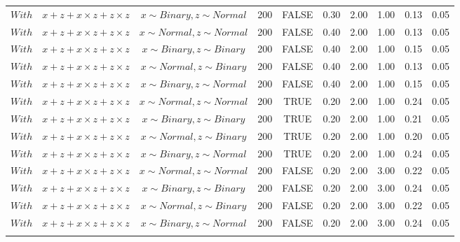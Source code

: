 \begin{longtable}{lccccccccc}
  $With$ & $\textit{x} + \textit{z} + \textit{x} \times \textit{z} + \textit{z} \times \textit{z}$ & $\textit{x} \sim Binary, \textit{z} \sim Normal$ & 200 & FALSE & 0.30 & 2.00 & 1.00 & 0.13 & 0.05 \\ 
  $With$ & $\textit{x} + \textit{z} + \textit{x} \times \textit{z} + \textit{z} \times \textit{z}$ & $\textit{x} \sim Normal , \textit{z} \sim Normal$ & 200 & FALSE & 0.40 & 2.00 & 1.00 & 0.13 & 0.05 \\ 
  $With$ & $\textit{x} + \textit{z} + \textit{x} \times \textit{z} + \textit{z} \times \textit{z}$ & $\textit{x} \sim Binary, \textit{z} \sim Binary$ & 200 & FALSE & 0.40 & 2.00 & 1.00 & 0.15 & 0.05 \\ 
  $With$ & $\textit{x} + \textit{z} + \textit{x} \times \textit{z} + \textit{z} \times \textit{z}$ & $\textit{x} \sim Normal, \textit{z} \sim Binary$ & 200 & FALSE & 0.40 & 2.00 & 1.00 & 0.13 & 0.05 \\ 
  $With$ & $\textit{x} + \textit{z} + \textit{x} \times \textit{z} + \textit{z} \times \textit{z}$ & $\textit{x} \sim Binary, \textit{z} \sim Normal$ & 200 & FALSE & 0.40 & 2.00 & 1.00 & 0.15 & 0.05 \\ 
  $With$ & $\textit{x} + \textit{z} + \textit{x} \times \textit{z} + \textit{z} \times \textit{z}$ & $\textit{x} \sim Normal , \textit{z} \sim Normal$ & 200 & TRUE & 0.20 & 2.00 & 1.00 & 0.24 & 0.05 \\ 
  $With$ & $\textit{x} + \textit{z} + \textit{x} \times \textit{z} + \textit{z} \times \textit{z}$ & $\textit{x} \sim Binary, \textit{z} \sim Binary$ & 200 & TRUE & 0.20 & 2.00 & 1.00 & 0.21 & 0.05 \\ 
  $With$ & $\textit{x} + \textit{z} + \textit{x} \times \textit{z} + \textit{z} \times \textit{z}$ & $\textit{x} \sim Normal, \textit{z} \sim Binary$ & 200 & TRUE & 0.20 & 2.00 & 1.00 & 0.20 & 0.05 \\ 
  $With$ & $\textit{x} + \textit{z} + \textit{x} \times \textit{z} + \textit{z} \times \textit{z}$ & $\textit{x} \sim Binary, \textit{z} \sim Normal$ & 200 & TRUE & 0.20 & 2.00 & 1.00 & 0.24 & 0.05 \\ 
  $With$ & $\textit{x} + \textit{z} + \textit{x} \times \textit{z} + \textit{z} \times \textit{z}$ & $\textit{x} \sim Normal , \textit{z} \sim Normal$ & 200 & FALSE & 0.20 & 2.00 & 3.00 & 0.22 & 0.05 \\ 
  $With$ & $\textit{x} + \textit{z} + \textit{x} \times \textit{z} + \textit{z} \times \textit{z}$ & $\textit{x} \sim Binary, \textit{z} \sim Binary$ & 200 & FALSE & 0.20 & 2.00 & 3.00 & 0.24 & 0.05 \\ 
  $With$ & $\textit{x} + \textit{z} + \textit{x} \times \textit{z} + \textit{z} \times \textit{z}$ & $\textit{x} \sim Normal, \textit{z} \sim Binary$ & 200 & FALSE & 0.20 & 2.00 & 3.00 & 0.22 & 0.05 \\ 
  $With$ & $\textit{x} + \textit{z} + \textit{x} \times \textit{z} + \textit{z} \times \textit{z}$ & $\textit{x} \sim Binary, \textit{z} \sim Normal$ & 200 & FALSE & 0.20 & 2.00 & 3.00 & 0.24 & 0.05 \\ 
   \hline
\hline
\label{tab:apptabFull}
\end{longtable}
